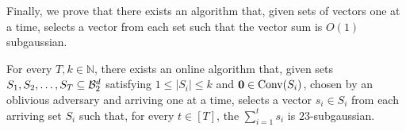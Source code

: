 Finally, we prove that there exists an algorithm that, given sets of vectors one at a time, selects a vector from each set such that the vector sum is $O(1)$ subgaussian.

\begin{theorem}\label{theorem:subgauss-algo}
    For every $T, k \in \mathbb{N}$, there exists an online algorithm that, given sets $S_1, S_2, \ldots, S_T \subseteq \mathcal{B}^d_2$ satisfying $1 \leq |S_i| \leq k$ and $\mathbf{0} \in \mathrm{Conv}(S_i)$, chosen by an oblivious adversary and arriving one at a time, selects a vector $s_i \in S_i$ from each arriving set $S_i$ such that, for every $t \in [T]$, the $\sum_{i=1}^t s_i$ is $23$-subgaussian. %
\end{theorem}

